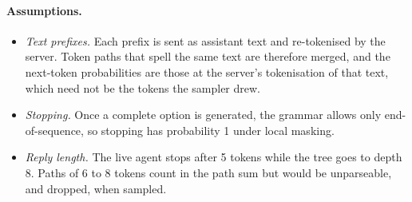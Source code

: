 \paragraph{Assumptions.}
\begin{itemize}[leftmargin=*,itemsep=2pt]
  \item \emph{Text prefixes.} Each prefix is sent as assistant text and re-tokenised by the server. Token paths that spell the same text are therefore merged, and the next-token probabilities are those at the server's tokenisation of that text, which need not be the tokens the sampler drew. 
  \item \emph{Stopping.} Once a complete option is generated, the grammar allows only end-of-sequence, so stopping has probability 1 under local masking.
  \item \emph{Reply length.} The live agent stops after 5 tokens while the tree goes to depth 8. Paths of 6 to 8 tokens count in the path sum but would be unparseable, and dropped, when sampled. 
\end{itemize}

